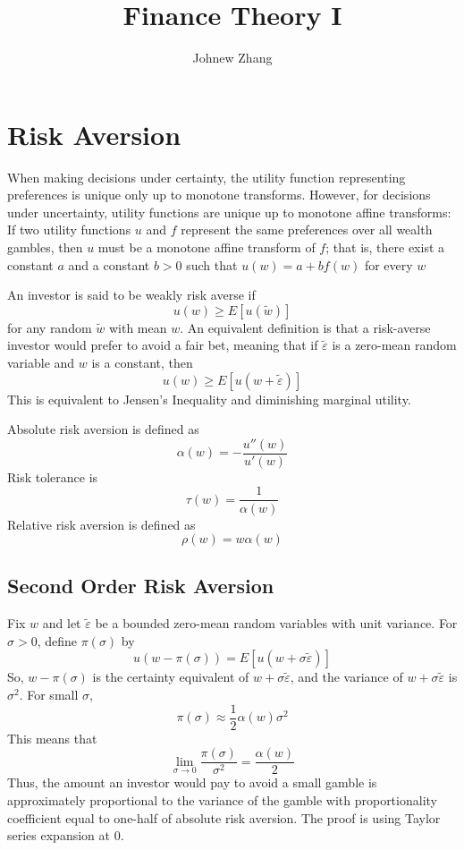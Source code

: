 \documentclass[11pt, a4paper, oneside]{article}
\title{Finance Theory I}
\author{Johnew Zhang}
\theoremstyle{definition}
\theoremstyle{proposition}
\theoremstyle{corollary}
\theoremstyle{lemma}
\theoremstyle{theorem}
\begin{document}
 

\def\angl#1{{%
\vbox{\hrule height .2pt 
\kern 1pt 
\hbox{$\scriptstyle {#1}\kern 1pt$}%
}\kern-.05pt \vrule width .2pt 
}} 

\def\tcelife#1{{\buildrel \circ \over e}_{#1}}

\maketitle

\hline

\tableofcontents
\addcontentsline 

\newpage

\section{Risk Aversion}
When making decisions under certainty, the utility function representing preferences is unique only up to monotone transforms. However, for decisions under uncertainty, utility functions are unique up to monotone affine transforms: If two utility functions $u$ and $f$ represent the same preferences over all wealth gambles, then $u$ must be a monotone affine transform of $f$; that is, there exist a constant $a$ and a constant $b>0$ such that $u(w) = a+bf(w)$ for every $w$

An investor is said to be weakly risk averse if $$u(w) \geq E[u(\tilde{w})]$$ for any random $\tilde{w}$ with mean $w$. An equivalent definition is that a risk-averse investor would prefer to avoid a fair bet, meaning that if $\tilde{\varepsilon}$ is a zero-mean random variable and $w$ is a constant, then
$$u(w) \geq E[u(w+\tilde{\varepsilon})]$$
 This is equivalent to Jensen's Inequality and diminishing marginal utility. 

Absolute risk aversion is defined as $$\alpha(w) = -\frac{u''(w)}{u'(w)}$$ 
Risk tolerance is $$\tau(w) = \frac{1}{\alpha(w)}$$
Relative risk aversion is defined as $$\rho(w) = w\alpha(w)$$

\subsection{Second Order Risk Aversion}
Fix $w$ and let $\tilde{\varepsilon}$ be a bounded zero-mean random variables with unit variance. For $\sigma>0$, define $\pi(\sigma)$ by
$$u(w- \pi(\sigma)) = E[u(w+\sigma\tilde{\varepsilon})]$$
So, $w-\pi(\sigma)$ is the certainty equivalent of $w+\sigma\tilde{\varepsilon}$, and the variance of $w+\sigma \tilde{\varepsilon}$ is $\sigma^2$. For small $\sigma$, $$\pi(\sigma)\approx \frac{1}{2}\alpha(w)\sigma^2$$
This means that $$\lim_{\sigma\to0}\frac{\pi(\sigma)}{\sigma^2} = \frac{\alpha(w)}{2}$$
Thus, the amount an investor would pay to avoid a small gamble is approximately proportional to the variance of the gamble with proportionality coefficient equal to one-half of absolute risk aversion. The proof is using Taylor series expansion at 0. 
\end{document}
